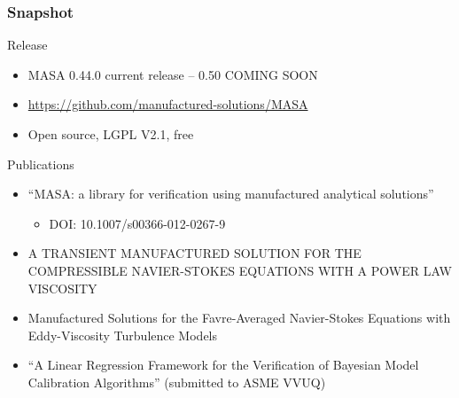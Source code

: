 \documentclass[mathserif]{beamer}
\begin{document}
\begin{frame}
  \frametitle{Snapshot}

  \begin{block}{Release}
    \begin{itemize} 
    \item MASA 0.44.0 current release -- 0.50 COMING SOON
    \item \url{https://github.com/manufactured-solutions/MASA}
    \item Open source, LGPL V2.1, free
    \end{itemize}
  \end{block}

  \begin{block}{Publications}
   \begin{itemize}
    \item ``MASA: a library for verification using manufactured
	  analytical solutions''
    \begin{itemize}
     \item DOI: 10.1007/s00366-012-0267-9
    \end{itemize}
    \small
   \item A TRANSIENT MANUFACTURED SOLUTION FOR THE COMPRESSIBLE NAVIER-STOKES EQUATIONS WITH A POWER LAW VISCOSITY
   \item Manufactured Solutions for the Favre-Averaged Navier-Stokes Equations with Eddy-Viscosity Turbulence Models
   \item ``A Linear Regression Framework for the Verification of Bayesian Model Calibration Algorithms'' (submitted to ASME VVUQ)

   \end{itemize}
  \end{block}

\end{frame}
\end{document}
